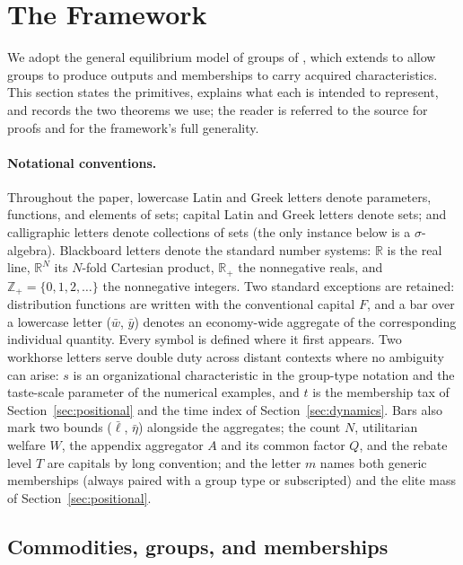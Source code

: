 \documentclass[12pt,letterpaper]{article}
\theoremstyle{definition}
\newcommand{\R}{\mathbb{R}}
\begin{document}
\section{The Framework}\label{sec:framework}

We adopt the general equilibrium model of groups of \citet{ellickson2006organization}, which extends \citet{ellickson1999clubs} to allow groups to produce outputs and memberships to carry acquired characteristics.
This section states the primitives, explains what each is intended to represent, and records the two theorems we use; the reader is referred to the source for proofs and for the framework's full generality.

\paragraph{Notational conventions.}
Throughout the paper, lowercase Latin and Greek letters denote parameters, functions, and elements of sets; capital Latin and Greek letters denote sets; and calligraphic letters denote collections of sets (the only instance below is a $\sigma$-algebra).
Blackboard letters denote the standard number systems: $\R$ is the real line, $\R^N$ its $N$-fold Cartesian product, $\R_+$ the nonnegative reals, and $\mathbb{Z}_+=\{0,1,2,\dots\}$ the nonnegative integers.
Two standard exceptions are retained: distribution functions are written with the conventional capital $F$, and a bar over a lowercase letter ($\bar{w}$, $\bar{y}$) denotes an economy-wide aggregate of the corresponding individual quantity.
Every symbol is defined where it first appears.
Two workhorse letters serve double duty across distant contexts where no ambiguity can arise: $s$ is an organizational characteristic in the group-type notation and the taste-scale parameter of the numerical examples, and $t$ is the membership tax of Section~\ref{sec:positional} and the time index of Section~\ref{sec:dynamics}.
Bars also mark two bounds ($\bar\ell$, $\bar\eta$) alongside the aggregates; the count $N$, utilitarian welfare $W$, the appendix aggregator $A$ and its common factor $Q$, and the rebate level $T$ are capitals by long convention; and the letter $m$ names both generic memberships (always paired with a group type or subscripted) and the elite mass of Section~\ref{sec:positional}.

\subsection{Commodities, groups, and memberships}
\end{document}
